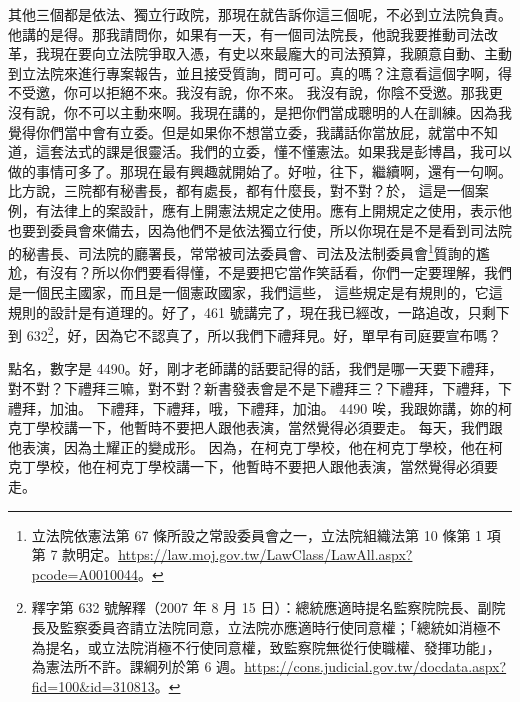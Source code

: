 \hypertarget{c08:cue:215}{}其他三個都是依法、獨立行政院，那現在就告訴你這三個呢，不必到立法院負責。他講的是得。那我請問你，如果有一天，有一個司法院長，他說我要推動司法改革，我現在要向立法院爭取入憑，有史以來最龐大的司法預算，我願意自動、主動到立法院來進行專案報告，並且接受質詢，問可可。真的嗎？注意看這個字啊，得不受邀，你可以拒絕不來。我沒有說，你不來。
\hypertarget{c08:cue:216}{}我沒有說，你陰不受邀。那我更沒有說，你不可以主動來啊。我現在講的，是把你們當成聰明的人在訓練。因為我覺得你們當中會有立委。但是如果你不想當立委，我講話你當放屁，就當中不知道，這套法式的課是很靈活。我們的立委，懂不懂憲法。如果我是彭博昌，我可以做的事情可多了。那現在最有興趣就開始了。好啦，往下，繼續啊，還有一句啊。比方說，三院都有秘書長，都有處長，都有什麼長，對不對？於，
\hypertarget{c08:cue:217}{}這是一個案例，有法律上的案設計，應有上開憲法規定之使用。應有上開規定之使用，表示他也要到委員會來備去，因為他們不是依法獨立行使，所以你現在是不是看到司法院的秘書長、司法院的廳署長，常常被司法委員會、司法及法制委員會\footnote{立法院依憲法第 67 條所設之常設委員會之一，立法院組織法第 10 條第 1 項第 7 款明定。\url{https://law.moj.gov.tw/LawClass/LawAll.aspx?pcode=A0010044}。}質詢的尷尬，有沒有？所以你們要看得懂，不是要把它當作笑話看，你們一定要理解，我們是一個民主國家，而且是一個憲政國家，我們這些，
\hypertarget{c08:cue:218}{}這些規定是有規則的，它這規則的設計是有道理的。好了，461 號講完了，現在我已經改，一路追改，只剩下到 632\footnote{釋字第 632 號解釋（2007 年 8 月 15 日）：總統應適時提名監察院院長、副院長及監察委員咨請立法院同意，立法院亦應適時行使同意權；「總統如消極不為提名，或立法院消極不行使同意權，致監察院無從行使職權、發揮功能」，為憲法所不許。課綱列於第 6 週。\url{https://cons.judicial.gov.tw/docdata.aspx?fid=100&id=310813}。}，好，因為它不認真了，所以我們下禮拜見。好，單早有司庭要宣布嗎？

\hypertarget{c08:cue:219}{}點名，數字是 4490。好，剛才老師講的話要記得的話，我們是哪一天要下禮拜，對不對？下禮拜三嘛，對不對？新書發表會是不是下禮拜三？下禮拜，下禮拜，下禮拜，加油。
\hypertarget{c08:cue:220}{}下禮拜，下禮拜，哦，下禮拜，加油。
\hypertarget{c08:cue:221}{}4490
\hypertarget{c08:cue:222}{}唉，我跟妳講，妳的柯克丁學校講一下，他暫時不要把人跟他表演，當然覺得必須要走。
\hypertarget{c08:cue:223}{}每天，我們跟他表演，因為土耀正的變成形。
\hypertarget{c08:cue:224}{}因為，在柯克丁學校，他在柯克丁學校，他在柯克丁學校，他在柯克丁學校講一下，他暫時不要把人跟他表演，當然覺得必須要走。
